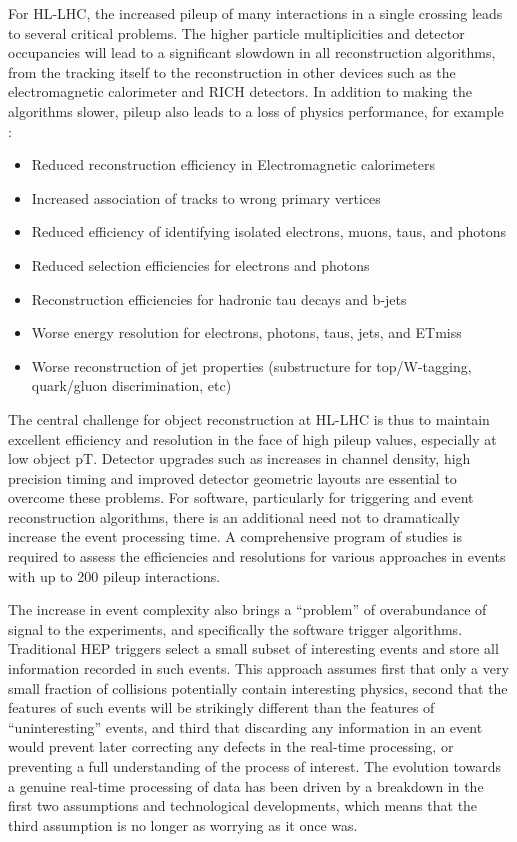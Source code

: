 For HL-LHC, the increased pileup of many interactions in a single crossing leads to several critical problems. The higher particle multiplicities and detector occupancies will lead to a significant slowdown in all reconstruction algorithms, from the tracking itself to the reconstruction in other devices such as the electromagnetic calorimeter and RICH detectors. In addition to making the algorithms slower, pileup also leads to a loss of physics performance, for example :
\begin{itemize}
\item Reduced reconstruction efficiency in Electromagnetic calorimeters
\item Increased association of tracks to wrong primary vertices
\item Reduced efficiency of identifying isolated electrons, muons, taus, and photons
\item Reduced selection efficiencies for electrons and photons
\item Reconstruction efficiencies for hadronic tau decays and b-jets
\item Worse energy resolution for electrons, photons, taus, jets, and ETmiss
\item Worse reconstruction of jet properties (substructure for top/W-tagging, quark/gluon discrimination, etc)
\end{itemize}

The central challenge for object reconstruction at HL-LHC is thus to maintain excellent efficiency and resolution in the face of high pileup values, especially at low object pT. Detector upgrades such as increases in channel density, high precision timing and improved detector geometric layouts are essential to overcome these problems. For software, particularly for triggering and event reconstruction algorithms, there is an additional need not to dramatically increase the event processing time. A comprehensive program of studies is required to assess the efficiencies and resolutions for various approaches in events with up to 200 pileup interactions. 

The increase in event complexity also brings a “problem” of overabundance of signal to the experiments, and specifically the software trigger algorithms. Traditional HEP triggers select a small subset of interesting events and store all information recorded in such events. This approach assumes first that only a very small fraction of collisions potentially contain interesting physics, second that the features of such events will be strikingly different than the features of “uninteresting” events, and third that discarding any information in an event would prevent later correcting any defects in the real-time processing, or preventing a full understanding of the process of interest. The evolution towards a genuine real-time processing of data has been driven by a breakdown in the first two assumptions and technological developments, which means that the third assumption is no longer as worrying as it once was.

